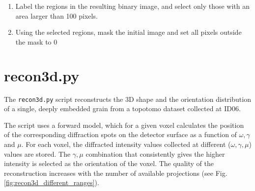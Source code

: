 \documentclass[11pt]{scrartcl}
\begin{document}
\begin{enumerate}
\begin{enumerate}
        \item Label the regions in the resulting binary image, and select only those with an area larger than 100 pixels. 
        
        
        \item Using the selected regions, mask the initial image and set all pixels outside the mask to 0
    \end{enumerate}
    
\end{enumerate}



\section{recon3d.py}
\label{sec:recon3d}

The {\texttt{recon3d.py}} script reconstructs the {\footnotesize{3D}} shape and the orientation distribution of a single, deeply embedded grain from a topotomo dataset collected at {\footnotesize{ID06}}. 

The script uses a forward model, which for a given voxel calculates the position of the corresponding diffraction spots on the detector surface as a function of $\omega, \gamma$ and $\mu$. For each voxel, the diffracted intensity values collected at different ($\omega, \gamma, \mu$) values are stored. The $\gamma, \mu$ combination that consistently gives the higher intensity is selected as the orientation of the voxel. The quality of the reconstruction increases with the number of available projections (see Fig. \ref{fig:recon3d_different_ranges}).
\end{document}
